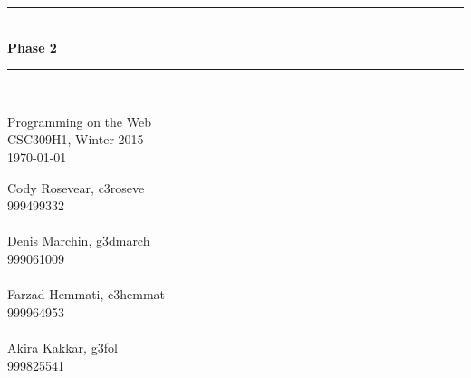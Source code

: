 \documentclass[12pt]{article}
\begin{document}
\begin{titlepage}
\newcommand{\HRule}{\rule{\linewidth}{0.5mm}} %
\center %
\HRule \\[0.4cm]
{ \huge \bfseries Phase 2}\\[0.4cm] %
\HRule \\[1.5cm]
\begin{minipage}{0.4\textwidth}
\begin{center} \large
Programming on the Web\\
CSC309H1, Winter 2015\\
\today
\end{center}
\end{minipage}
\vfill %
Cody Rosevear, c3roseve\\
999499332\\
\\
Denis Marchin, g3dmarch\\
999061009\\
\\
Farzad Hemmati, c3hemmat\\
999964953\\
\\
Akira Kakkar, g3fol\\
999825541\\
\\
\end{titlepage}
\newpage
\end{document}
